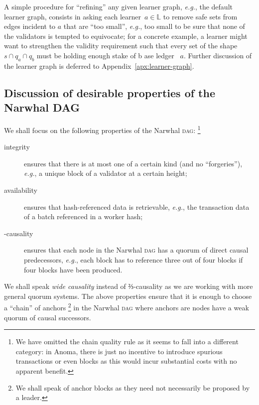 \documentclass[%
dvipsnames
]{article}
\theoremstyle{definition}
\newcommand{\base}[1][ ]{%
  b\ase[#1]%
}
\newcommand{\ase}[1][ ]{%
  ase ledger%
  \ifthenelse{\equal{#1}{ }}{}{#1}\xspace%
}
\newcommand{\Dag}[1][]{\textsc{dag}#1\xspace}
\newcommand{\eg}[1][, ]{\emph{e.g.}#1}
\newcommand{\q}[2][]{%
  q#1_{#2}%
}
\renewcommand{\todo}[2][]{}
\newcounter{old\v,\r}\setcounter{old\v,\r}{0}%
\begin{document}
A simple procedure for ``refining'' any given learner graph, %
\eg the default learner graph, %
consists in asking each learner \(a∈𝕃\) %
to remove safe sets from edges incident to \(a\) that are ``too small'', %
\eg too small to be sure that none of the validators is tempted to equivocate; %
for a concrete example, %
a learner might want to strengthen the validity requirement such that
every set of the shape \(s\cap \q{a} \cap \q{b}\) must be holding enough stake of \base \(a\). %
Further discussion of the learner graph is deferred to Appendix~\ref{apx:learner-graph}. %

\subsection{Discussion of desirable properties of the Narwhal DAG}
\label{sec:property-discussion}

We shall focus on the following properties of the Narwhal \Dag \cite{NT}:\xspace%
\footnote{%
  We have omitted the chain quality rule as %
  it seems to fall into a different category: %
  in Anoma, %
  there is just no incentive to introduce spurious transactions or even blocks %
  as this would incur substantial costs with no apparent benefit. %
}
\begin{description}
\item[integrity] %
  ensures that there is at most one of a certain kind (and no ``forgeries''), %
  \eg a unique block of a validator at a certain height; %
\item [availability] %
  ensures that hash-referenced data is retrievable, %
  \eg the transaction data of a batch referenced in a worker hash; %
\item [-causality] %
  ensures that each node in the Narwhal \Dag has %
  a quorum of direct causal predecessors, %
  \eg each block has to reference three out of four blocks if %
  four blocks have been produced. %
\end{description}
We shall speak \emph{wide causality} instead of ⅔-causality %
as we are working with more general quorum systems. %
The above properties ensure that it is enough to choose a 
``chain'' of anchors\xspace%
\footnote{%
  We shall speak of anchor blocks as %
  they need not necessarily be proposed by a
  leader. %
}\todo{add citation to footnote to \emph{anchor block}} 
in the Narwhal \Dag %
where anchors are nodes have a weak quorum of causal successors.
\todo[inline,caption={}]{%
  add illustration of superimposed dags with chosen anchor block
}
\end{document}
